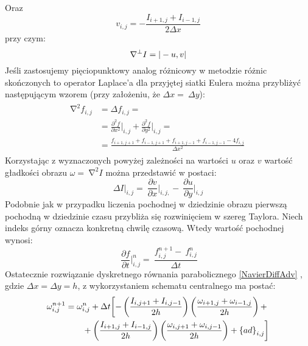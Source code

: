 \documentclass[12pt, twoside, openany]{report}
\theoremstyle{definition}
\begin{document}
Oraz
\begin{equation}
 v_{i,j}=-\frac{I_{i+1,j}+I_{i-1,j}}{2\Delta x}
\label{v}
\end{equation}
przy czym:
\begin{equation}\\
{\mathrm{\nabla }}^{\bot }I=|-u,v|
\label{gradI}
\end{equation}
Jeśli zastosujemy pięciopunktowy analog różnicowy w metodzie różnic skończonych to operator Laplace’a dla przyjętej siatki Eulera można przybliżyć następującym wzorem (przy założeniu, że $\Delta x=\ \Delta y$):
\begin{align}
\begin{aligned}
{\mathrm{\nabla }}^2f_{i,j} &= \Delta f_{i,j}=\\[1ex]
&={\frac{{\partial }^2f}{\partial x^2}}\bigg|_{i,j}+{\frac{{\partial }^2f}{\partial y^2}}\bigg|_{i,j}=\\
&=\frac{f_{i+1,j+1}+f_{i-1,j+1}+f_{i+1,j-1}+f_{i-1,j-1}-4f_{i,j}}{\Delta x^2}\ 
\end{aligned}
\label{LaplaceOpr}
\end{align}
Korzystając z wyznaczonych powyżej zależności na wartości $u$ oraz $v$ wartość gładkości obrazu $\omega =\ {\mathrm{\nabla }}^2I$ można przedstawić w postaci: 
\begin{equation}
\Delta {I}\big|_{i,j}=\ {\frac{\partial v}{\partial x}}\bigg|_{i,j,}-\ {\frac{\partial u}{\partial y}}\bigg|_{i,j}
\label{discreteVorticity}
\end{equation}
Podobnie jak w przypadku liczenia pochodnej w dziedzinie obrazu pierwszą pochodną w dziedzinie czasu przybliża się rozwinięciem w szereg Taylora. Niech indeks górny oznacza konkretną chwilę czasową. Wtedy wartość pochodnej wynosi:
\begin{equation}
\ {{\frac{\partial f}{\partial t}}\bigg|^n_{i,j}=\ \frac{f^{n+1}_{i,j}-\ f^n_{i,j}}{\Delta t}}
\label{dfdt}
\end{equation}
Ostatecznie rozwiązanie dyskretnego równania parabolicznego \eqref{NavierDiffAdv} , gdzie $\Delta x= \Delta y=h$, z wykorzystaniem schematu centralnego ma postać:
\begin{align}
{\omega }^{n+1}_{i,j} &= {\omega }^n_{i,j}+\Delta t\biggl[
-\left(\frac{I_{i,j+1}+I_{i,j-1}}{2h}\right)\left(\frac{{\omega }_{i+1,j}
+{\omega }_{i-1,j}}{2h}\right)+\notag\\ 
&\qquad+ \left(\frac{I_{i+1,j}+I_{i-1,j}}{2h}\right)\left(\frac{{\omega }_{i,j+1}+{\omega }_{i,j-1}}{2h}\right)+{\left\{ad\right\}}_{i,j} \biggr]
\label{NavierDiffAdvCen}
\end{align}
\end{document}
